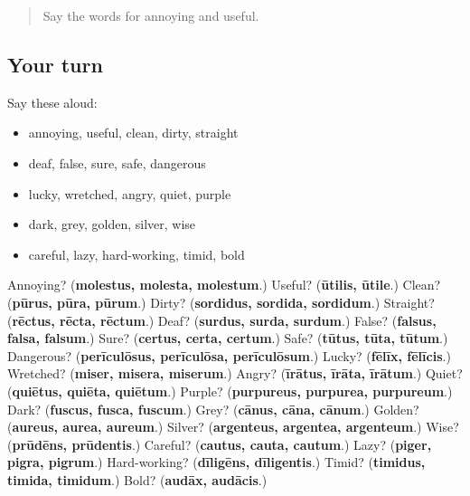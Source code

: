 \begin{quote}
Say the words for annoying and useful.
\end{quote}

\subsection*{Your turn}
Say these aloud:

\begin{itemize}
\raggedright
  \item annoying, useful, clean, dirty, straight
  \item deaf, false, sure, safe, dangerous
  \item lucky, wretched, angry, quiet, purple
  \item dark, grey, golden, silver, wise
  \item careful, lazy, hard-working, timid, bold
\end{itemize}

\begin{tcolorbox}[breakable,colback=teal!4,colframe=teal!35!black,title={Before you move on}]
Annoying? (\textbf{molestus, molesta, molestum}.) Useful? (\textbf{ūtilis, ūtile}.) Clean? (\textbf{pūrus, pūra, pūrum}.) Dirty? (\textbf{sordidus, sordida, sordidum}.) Straight? (\textbf{rēctus, rēcta, rēctum}.) Deaf? (\textbf{surdus, surda, surdum}.) False? (\textbf{falsus, falsa, falsum}.) Sure? (\textbf{certus, certa, certum}.) Safe? (\textbf{tūtus, tūta, tūtum}.) Dangerous? (\textbf{perīculōsus, perīculōsa, perīculōsum}.) Lucky? (\textbf{fēlīx, fēlīcis}.) Wretched? (\textbf{miser, misera, miserum}.) Angry? (\textbf{īrātus, īrāta, īrātum}.) Quiet? (\textbf{quiētus, quiēta, quiētum}.) Purple? (\textbf{purpureus, purpurea, purpureum}.) Dark? (\textbf{fuscus, fusca, fuscum}.) Grey? (\textbf{cānus, cāna, cānum}.) Golden? (\textbf{aureus, aurea, aureum}.) Silver? (\textbf{argenteus, argentea, argenteum}.) Wise? (\textbf{prūdēns, prūdentis}.) Careful? (\textbf{cautus, cauta, cautum}.) Lazy? (\textbf{piger, pigra, pigrum}.) Hard-working? (\textbf{dīligēns, dīligentis}.) Timid? (\textbf{timidus, timida, timidum}.) Bold? (\textbf{audāx, audācis}.)
\end{tcolorbox}
